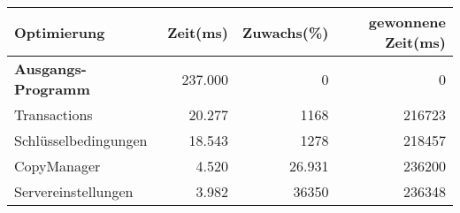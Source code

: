 \setlength{\extrarowheight}{2pt}

\begin{tabular}{l|rrr}
\rowcolor{heading}
\color{white}\textbf{Optimierung} &
\color{white}\textbf{Zeit(ms)} &
\color{white}\textbf{Zuwachs(\%)} &
\color{white}\textbf{gewonnene Zeit(ms)}\\
\hline
\textbf{Ausgangs-Programm} & 237.000 & 0 & 0\\

Transactions & 20.277 & 1168 & 216723\\
Schlüsselbedingungen & 18.543 & 1278 & 218457\\
CopyManager & 4.520 & 26.931 & 236200\\
Servereinstellungen & 3.982 & 36350 & 236348\\

\hline
\end{tabular}

